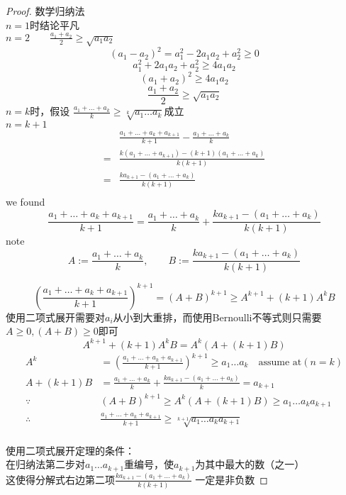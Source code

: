 \begin{proof}\label{1}
数学归纳法\\ 
$n=1$时结论平凡\\
$n=2\qquad \frac{a_1+a_2}{2} \geq \sqrt{a_1a_2}$\\
\[(a_1 - a_2)^2 = a_1^2 - 2 a_1 a_2 + a_2^2 \geq 0 \]
\[a_1^2 + 2a_1a_2 + a_2^2 \geq 4a_1a_2\]
\[(a_1+a_2)^2\geq 4a_1a_2\]
\[\frac{a_1+a_2}{2}\geq \sqrt{a_1a_2}\]
$n=k$时，假设 $\frac{a_1+\dots+a_k}{k}\geq \sqrt[k]{a_1\dots a_k}$成立\\
$ n=k+1 $
\begin{equation}
\begin{aligned}
	&\frac{a_1+\dots + a_k + a_{k+1}}{k+1}-\frac{a_1+\dots +a_k}{k} \\
	=&\frac{k(a_1+\dots+a_{k+1})-(k+1)(a_1+\dots+a_k)}{k(k+1)}\\
	=&\frac{ka_{k+1}-(a_1+\dots+a_k)}{k(k+1)}\\		
\end{aligned}
\end{equation}
we found 
\[\frac{a_1+\dots + a_k + a_{k+1}}{k+1} =  \frac{a_1+\dots + a_k}{k} + \frac{ka_{k+1}-(a_1+\dots + a_k)}{k(k+1)} \]
note \[ A := \frac{a_1+\dots + a_k}{k} , \qquad B:=\frac{ka_{k+1}-(a_1+\dots + a_k)}{k(k+1)}\]

\begin{equation}
	(\frac{a_1+\dots + a_k + a_{k+1}}{k+1})^{k+1}=(A+B)^{k+1}\geq A^{k+1}+(k+1)A^k B
\end{equation}
使用二项式展开需要对$ a_i $从小到大重排，而使用Bernoulli不等式则只需要$ A\geq 0, (A+B)\geq 0 $即可
\begin{equation}
	A^{k+1}+(k+1)A^k B = A^k(A+(k+1)B)
\end{equation}
\begin{equation}
	\begin{aligned}
		A^k& =	(\frac{a_1+\dots + a_k + a_{k+1}}{k+1})^{k+1} \geq a_1\dots a_k \quad \text{assume at}(n=k)\\
		A+(k+1)B&= \frac{a_1+\dots + a_k}{k} + \frac{ka_{k+1}-(a_1+\dots + a_k)}{k} = a_{k+1}\\
		\because& (A+B)^{k+1}\geq A^k(A+(k+1)B)\geq a_1 \dots a_k  a_{k+1}\\
		\therefore & 	\frac{a_1+\dots + a_k + a_{k+1}}{k+1} \geq  \sqrt[k+1]{a_1 \dots a_k  a_{k+1}}\\
	\end{aligned}
\end{equation}

使用二项式展开定理的条件：\\
在归纳法第二步对$a_1 \dots a_{k+1}  $重编号，使$ a_{k+1} $为其中最大的数（之一）\\
这使得分解式右边第二项$ \frac{ka_{k+1}-(a_1+\dots+a_k)}{k(k+1)} $ 一定是非负数
\end{proof}


